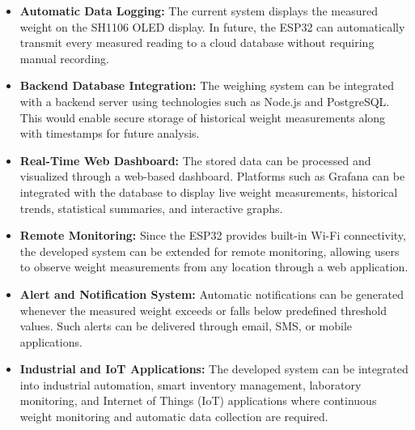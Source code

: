 \begin{itemize}

\item \textbf{Automatic Data Logging:} The current system displays the measured weight on the SH1106 OLED display. In future, the ESP32 can automatically transmit every measured reading to a cloud database without requiring manual recording.

\item \textbf{Backend Database Integration:} The weighing system can be integrated with a backend server using technologies such as Node.js and PostgreSQL. This would enable secure storage of historical weight measurements along with timestamps for future analysis.

\item \textbf{Real-Time Web Dashboard:} The stored data can be processed and visualized through a web-based dashboard. Platforms such as Grafana can be integrated with the database to display live weight measurements, historical trends, statistical summaries, and interactive graphs.

\item \textbf{Remote Monitoring:} Since the ESP32 provides built-in Wi-Fi connectivity, the developed system can be extended for remote monitoring, allowing users to observe weight measurements from any location through a web application.

\item \textbf{Alert and Notification System:} Automatic notifications can be generated whenever the measured weight exceeds or falls below predefined threshold values. Such alerts can be delivered through email, SMS, or mobile applications.

\item \textbf{Industrial and IoT Applications:} The developed system can be integrated into industrial automation, smart inventory management, laboratory monitoring, and Internet of Things (IoT) applications where continuous weight monitoring and automatic data collection are required.

\end{itemize}


